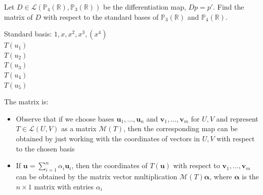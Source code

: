\documentclass [aspectratio=169]{beamer}
\newcommand{\bu}{{\mathbf{u}}}
\newcommand{\bv}{{\mathbf{v}}}
\newcommand{\R}{{\mathbb{R}}}
\newcommand{\F}{{\mathbb{F}}}
\begin{document}
\begin{frame}
\begin{example}
Let $D \in \mathcal{L}(\mathbb{P}_4(\R),\mathbb{P}_3(\R))$ be the differentiation map, $Dp = p'$. Find the matrix of $D$ with respect to the standard bases of $\mathbb{P}_3(\R)$ and $\mathbb{P}_4(\R)$.

Standard basis: $1, x, x^2, x^3, (x^4)$ \\
$T(u_1) $ \\
$T(u_2)  $ \\ 
$T(u_3) $ \\ 
$T(u_4) $ \\
$T(u_5) $
\vspace{1em}

The matrix is:
\vspace{2cm}
\end{example}

\end{frame}

\begin{frame}
\begin{itemize}
\item Observe that if we choose bases $\bu_1, \ldots, \bu_n$ and $\bv_1, \ldots, \bv_m$ for $U,V$ and represent $T\in \mathcal{L}(U,V)$ as a matrix $\mathcal{M}(T)$, then the corresponding map can be obtained by just working with the coordinates of vectors in $U,V$ with respect to the chosen basis
\item  If $\bu = \sum_{i=1}^n \alpha_i \bu_i$, then the coordinates of $T(\bu)$ with respect to $\bv_1, \ldots, \bv_m$ can be obtained by the matrix vector multiplication $\mathcal{M}(T)\boldsymbol{\alpha}$, where $\boldsymbol{\alpha}$ is the $n\times 1$ matrix with entries $\alpha_i$
\end{itemize}
\end{frame}
\end{document}
